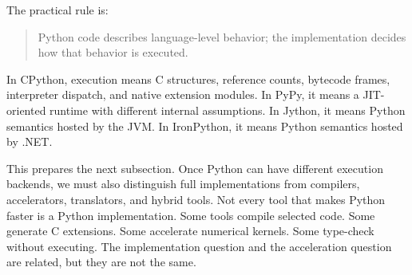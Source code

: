 The practical rule is:

\begin{quote}
Python code describes language-level behavior; the implementation decides how that behavior is executed.
\end{quote}

In CPython, execution means C structures, reference counts, bytecode frames, interpreter dispatch, and native extension modules. In PyPy, it means a JIT-oriented runtime with different internal assumptions. In Jython, it means Python semantics hosted by the JVM. In IronPython, it means Python semantics hosted by .NET.

This prepares the next subsection. Once Python can have different execution backends, we must also distinguish full implementations from compilers, accelerators, translators, and hybrid tools. Not every tool that makes Python faster is a Python implementation. Some tools compile selected code. Some generate C extensions. Some accelerate numerical kernels. Some type-check without executing. The implementation question and the acceleration question are related, but they are not the same.